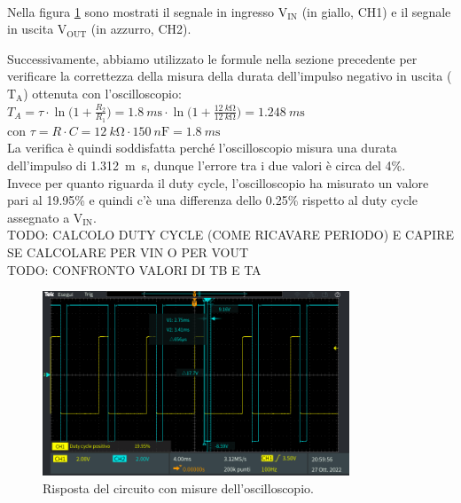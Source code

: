 \documentclass{report}
\begin{document}
\\\indent Nella figura \ref{figura:TEK00002} sono mostrati il segnale in ingresso $\mathrm{V_{IN}}$ (in giallo, CH1) e il segnale in uscita $\mathrm{V_{OUT}}$ (in azzurro, CH2).\par
Successivamente, abbiamo utilizzato le formule  nella sezione precedente per verificare la correttezza della misura della durata dell'impulso negativo in uscita ($\mathrm{T_A}$) ottenuta con l'oscilloscopio:
\\[4pt]\indent$\displaystyle{T_A=\tau\cdot\ln\biggl(1+\frac{R_2}{R_1}\biggr)=\SI{1.8}{m\second}\cdot\ln\biggl(1+\frac{\SI{12}{k\ohm}}{\SI{12}{k\ohm}}\biggr)=\SI{1.248}{m\second}}$
\\[8pt]\indent con $\displaystyle{\tau=R \cdot C=\SI{12}{k\ohm}\cdot\SI{150}{n\farad}=\SI{1.8}{m\second}}$
\\[4pt]La verifica è quindi soddisfatta perché l'oscilloscopio misura una durata dell'impulso di \SI{1.312}{m\second}, dunque l'errore tra i due valori è circa del 4\%.
\\Invece per quanto riguarda il duty cycle, l'oscilloscopio ha misurato un valore pari al 19.95\% e quindi c'è una differenza dello 0.25\% rispetto al duty cycle assegnato a $\mathrm{V_{IN}}$.
\\TODO: CALCOLO DUTY CYCLE (COME RICAVARE PERIODO) E CAPIRE SE CALCOLARE PER VIN O PER VOUT 
\\TODO: CONFRONTO VALORI DI TB E TA
\begin{figure}[h]
	\centering
	\includegraphics[height=5.5cm]{immagini/TEK00002}
	\caption{Risposta del circuito con misure dell'oscilloscopio.}
	\label{figura:TEK00002}
\end{figure} 
\end{document}
